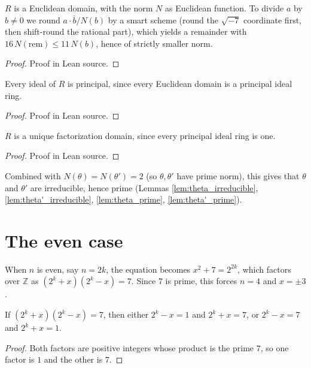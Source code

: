\begin{theorem}
  \label{thm:instEuclideanDomain}
  \leanok
  $R$ is a Euclidean domain, with the norm $N$ as Euclidean function. To divide
  $a$ by $b \neq 0$ we round $a \cdot \bar{b} / N(b)$ by a smart scheme (round
  the $\sqrt{-7}$ coordinate first, then shift-round the rational part), which
  yields a remainder with $16\,N(\mathrm{rem}) \leq 11\,N(b)$, hence of strictly
  smaller norm.
\end{theorem}
\begin{proof}\leanok
  Proof in Lean source.
\end{proof}

\begin{theorem}
  \label{thm:instPrincipalIdealRing}
  \leanok
  Every ideal of $R$ is principal, since every Euclidean domain is a principal
  ideal ring.
\end{theorem}
\begin{proof}\leanok
  Proof in Lean source.
\end{proof}

\begin{theorem}[$R$ is a UFD]
  \label{thm:instUniqueFactorizationMonoid}
  \leanok
  $R$ is a unique factorization domain, since every principal ideal ring is one.
\end{theorem}
\begin{proof}\leanok
  Proof in Lean source.
\end{proof}

Combined with $N(\theta) = N(\theta') = 2$ (so $\theta, \theta'$ have prime
norm), this gives that $\theta$ and $\theta'$ are irreducible, hence prime
(Lemmas \ref{lem:theta_irreducible}, \ref{lem:theta'_irreducible},
\ref{lem:theta_prime}, \ref{lem:theta'_prime}).

\section{The even case}

When $n$ is even, say $n = 2k$, the equation becomes $x^2 + 7 = 2^{2k}$, which factors
over $\mathbb{Z}$ as $(2^k + x)(2^k - x) = 7$. Since $7$ is prime, this forces
$n = 4$ and $x = \pm 3$.

\begin{lemma}
  \label{lem:ramanujan_nagell_even_pow_factors}
  \leanok
  If $(2^k + x)(2^k - x) = 7$, then either $2^k - x = 1$ and $2^k + x = 7$,
  or $2^k - x = 7$ and $2^k + x = 1$.
\end{lemma}
\begin{proof}\leanok
  Both factors are positive integers whose product is the prime $7$,
  so one factor is $1$ and the other is $7$.
\end{proof}

